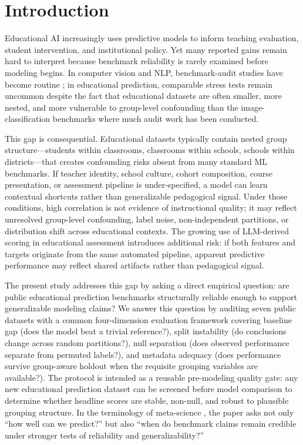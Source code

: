 \documentclass[10pt,letterpaper]{article}
\begin{document}
\clearpage
{}
\linenumbers

\section{Introduction}

Educational AI increasingly uses predictive models to inform teaching evaluation, student intervention, and institutional policy. Yet many reported gains remain hard to interpret because benchmark reliability is rarely examined before modeling begins. In computer vision and NLP, benchmark-audit studies have become routine \citep{Northcutt2021,Recht2019,Bouthillier2021}; in educational prediction, comparable stress tests remain uncommon despite the fact that educational datasets are often smaller, more nested, and more vulnerable to group-level confounding than the image-classification benchmarks where much audit work has been conducted.

This gap is consequential. Educational datasets typically contain nested group structure---students within classrooms, classrooms within schools, schools within districts---that creates confounding risks absent from many standard ML benchmarks. If teacher identity, school culture, cohort composition, course presentation, or assessment pipeline is under-specified, a model can learn contextual shortcuts rather than generalizable pedagogical signal. Under those conditions, high correlation is not evidence of instructional quality; it may reflect unresolved group-level confounding, label noise, non-independent partitions, or distribution shift across educational contexts. The growing use of LLM-derived scoring in educational assessment introduces additional risk: if both features and targets originate from the same automated pipeline, apparent predictive performance may reflect shared artifacts rather than pedagogical signal.

The present study addresses this gap by asking a direct empirical question: are public educational prediction benchmarks structurally reliable enough to support generalizable modeling claims? We answer this question by auditing seven public datasets with a common four-dimension evaluation framework covering baseline gap (does the model beat a trivial reference?), split instability (do conclusions change across random partitions?), null separation (does observed performance separate from permuted labels?), and metadata adequacy (does performance survive group-aware holdout when the requisite grouping variables are available?). The protocol is intended as a reusable pre-modeling quality gate: any new educational prediction dataset can be screened before model comparison to determine whether headline scores are stable, non-null, and robust to plausible grouping structure. In the terminology of meta-science \citep{Ioannidis2005}, the paper asks not only ``how well can we predict?'' but also ``when do benchmark claims remain credible under stronger tests of reliability and generalizability?''
\end{document}

